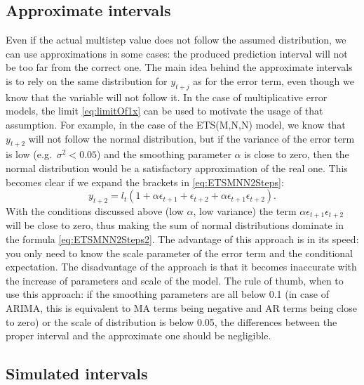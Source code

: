 \documentclass[]{book}
\theoremstyle{definition}
\theoremstyle{definition}
\theoremstyle{definition}
\theoremstyle{definition}
\theoremstyle{remark}
\begin{document}
\hypertarget{approximate-intervals}{%
\subsection{Approximate intervals}\label{approximate-intervals}}

Even if the actual multistep value does not follow the assumed distribution, we can use approximations in some cases: the produced prediction interval will not be too far from the correct one. The main idea behind the approximate intervals is to rely on the same distribution for \(y_{t+j}\) as for the error term, even though we know that the variable will not follow it. In the case of multiplicative error models, the limit \eqref{eq:limitOf1x} can be used to motivate the usage of that assumption. For example, in the case of the ETS(M,N,N) model, we know that \(y_{t+2}\) will not follow the normal distribution, but if the variance of the error term is low (e.g.~\(\sigma^2 < 0.05\)) and the smoothing parameter \(\alpha\) is close to zero, then the normal distribution would be a satisfactory approximation of the real one. This becomes clear if we expand the brackets in \eqref{eq:ETSMNN2Steps}:
\begin{equation}
    y_{t+2} = l_{t} (1 + \alpha \epsilon_{t+1} + \epsilon_{t+2} + \alpha \epsilon_{t+1} \epsilon_{t+2}) .
    \label{eq:ETSMNN2Steps2}
\end{equation}
With the conditions discussed above (low \(\alpha\), low variance) the term \(\alpha \epsilon_{t+1} \epsilon_{t+2}\) will be close to zero, thus making the sum of normal distributions dominate in the formula \eqref{eq:ETSMNN2Steps2}. The advantage of this approach is in its speed: you only need to know the scale parameter of the error term and the conditional expectation. The disadvantage of the approach is that it becomes inaccurate with the increase of parameters and scale of the model. The rule of thumb, when to use this approach: if the smoothing parameters are all below 0.1 (in case of ARIMA, this is equivalent to MA terms being negative and AR terms being close to zero) or the scale of distribution is below 0.05, the differences between the proper interval and the approximate one should be negligible.

\hypertarget{ADAMForecastingPISimulations}{%
\subsection{Simulated intervals}\label{ADAMForecastingPISimulations}}
\end{document}
